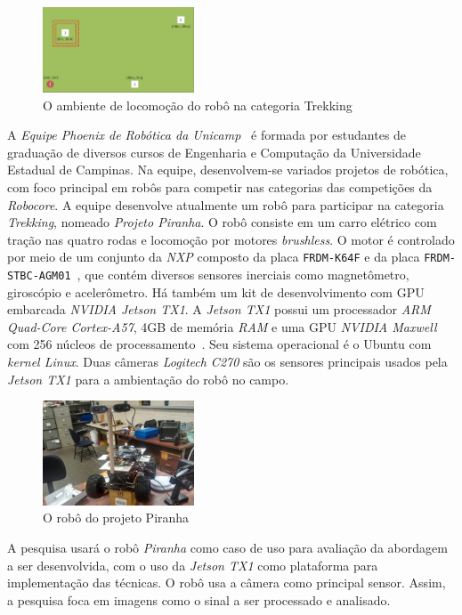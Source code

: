 \documentclass[8pt]{article}
\newcommand{\tit}[1]{\textit{#1}}
\newcommand{\ttt}[1]{\texttt{#1}}
\begin{document}
\begin{multicols}{2}
\begin{figure}[H]
  		\centering
    	\includegraphics[width=0.4\textwidth]{imgs/trekking_campo.png}
		\caption[9pt]{O ambiente de locomoção do robô na categoria Trekking}
\end{figure}

A \emph{Equipe Phoenix de Robótica da Unicamp}~\cite{phoenix} 
é formada por estudantes de graduação de diversos cursos de 
Engenharia e Computação da Universidade Estadual de Campinas. 
Na equipe, desenvolvem-se variados projetos de robótica,
com foco principal em robôs para competir nas categorias das competições da
\tit{Robocore}.  
A equipe desenvolve atualmente um robô para participar na categoria 
\tit{Trekking}, nomeado \tit{Projeto Piranha}. 
O robô consiste em um carro elétrico com tração nas quatro rodas e 
locomoção por motores \tit{brushless}.
O motor é controlado por meio de um conjunto da \tit{NXP} composto da placa
\ttt{FRDM-K64F} e da placa \ttt{FRDM-STBC-AGM01}~\cite{nxp}, que contém 
diversos sensores inerciais como magnetômetro, giroscópio e acelerômetro.
Há também um kit de desenvolvimento com GPU embarcada \tit{NVIDIA Jetson TX1}. 
A \tit{Jetson TX1} possui um processador \tit{ARM Quad-Core Cortex-A57},
4GB de memória \tit{RAM} e uma GPU \tit{NVIDIA Maxwell} com 256 núcleos de
processamento~\cite{tx1}. 
Seu sistema operacional é o Ubuntu com \tit{kernel Linux}.
Duas câmeras \tit{Logitech C270} são os sensores
principais usados pela \tit{Jetson TX1} para a ambientação do robô no campo.

\begin{figure}[H]
  		\centering
    	\includegraphics[width=0.4\textwidth]{imgs/piranha.jpg}
		\caption[9pt]{O robô do projeto Piranha}
\end{figure}

A pesquisa usará o robô \tit{Piranha} como caso de uso para
avaliação da abordagem a ser desenvolvida, com o uso da \tit{Jetson TX1} 
como plataforma para implementação das técnicas.
O robô usa a câmera como principal sensor.
Assim, a pesquisa foca em imagens como o sinal a ser processado e analisado. 


\end{multicols}
\end{document}
